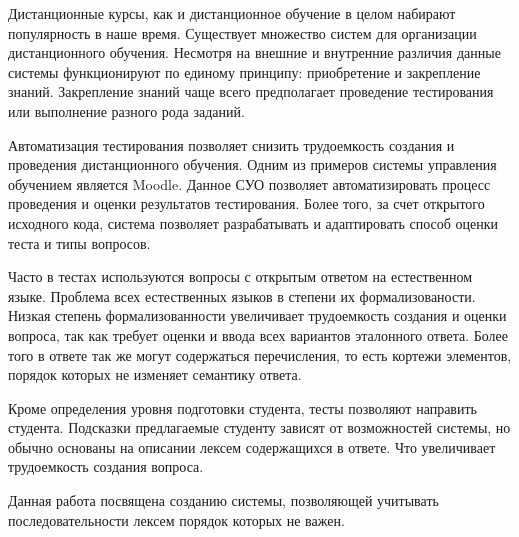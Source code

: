 \documentclass{standalone}
\begin{document}
\par Дистанционные курсы, как и дистанционное обучение в целом набирают популярность
в наше время. Существует множество систем для организации дистанционного обучения.
Несмотря на внешние и внутренние различия данные системы функционируют по единому принципу:
приобретение и закрепление знаний. Закрепление знаний чаще всего предполагает проведение
тестирования или выполнение разного рода заданий.
\par Автоматизация тестирования позволяет снизить трудоемкость создания и проведения
дистанционного обучения. Одним из примеров системы управления обучением является Moodle.
Данное СУО позволяет автоматизировать процесс проведения и оценки результатов тестирования.
Более того, за счет открытого исходного кода, система позволяет разрабатывать и адаптировать
способ оценки теста и типы вопросов.
\par Часто в тестах используются вопросы с открытым ответом на естественном языке. Проблема
всех естественных языков в степени их формализованости. Низкая степень формализованности
увеличивает трудоемкость создания и оценки вопроса, так как требует оценки и ввода
всех вариантов эталонного ответа. Более того в ответе так же могут содержаться перечисления,
то есть кортежи элементов, порядок которых не изменяет семантику ответа.
\par Кроме определения уровня подготовки студента, тесты позволяют направить студента.
Подсказки предлагаемые студенту зависят от возможностей системы, но обычно основаны на описании
лексем содержащихся в ответе. Что увеличивает трудоемкость создания вопроса.
\par Данная работа посвящена созданию системы, позволяющей учитывать
последовательности лексем порядок которых не важен.
\newpage
\end{document}
